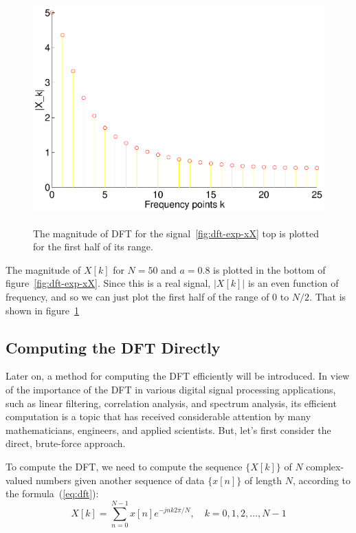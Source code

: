 \begin{figure}
\centerline{\includegraphics[height=3.5in]{ch-fft/dft_expX2}}
\caption{The magnitude of DFT for the
signal~\protect\ref{fig:dft-exp-xX} top is plotted for the first half
of its range.
\label{fig:dft-exp-X2}}
\end{figure}

The magnitude of $X[k]$ for $N=50$ and $a=0.8$ is plotted in the bottom
of figure~\ref{fig:dft-exp-xX}.  Since this is a real signal, $|X[k]|$
is an even function of frequency, and so we can just plot the first
half of the range of 0 to $N/2$. That is shown in
figure~\ref{fig:dft-exp-X2}

\subsection{Computing the DFT Directly}

Later on, a method for computing the DFT efficiently will be introduced.
In view of the importance of the DFT in various digital signal
processing applications, such as linear filtering, correlation
analysis, and spectrum analysis, its efficient computation is a topic
that has received considerable attention by many mathematicians,
engineers, and applied scientists. But, let's first consider the
direct, brute-force approach.

To compute the DFT, we need to compute the sequence $\{X[k]\}$ of $N$
complex-valued numbers given another sequence of data $\{x[n]\}$ of
length $N$, according to the formula~(\ref{eq:dft}):
\begin{equation*}
X[k] = \sum_{n=0}^{N-1} x[n] e^{-j n k 2\pi/N}, \quad k = 0,1,2,\ldots,
N-1
\end{equation*}

